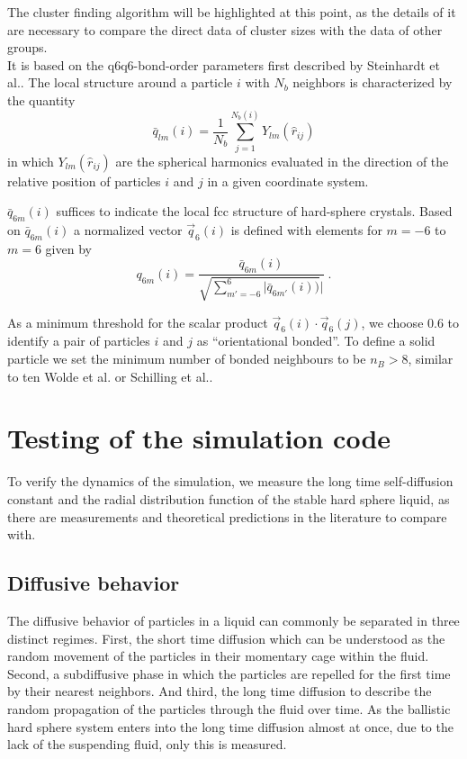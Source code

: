 The cluster finding algorithm will be highlighted at this point, as the details of it are necessary to compare the direct data of cluster sizes with the data of other groups.\\ 
It is based on the q6q6-bond-order parameters first described by Steinhardt et al.\cite{Steinhardt1983}.
The local structure around a particle $i$ with $N_b$ neighbors is characterized by the quantity
\begin{equation}
\label{eqn:local_q6}
\bar{q}_{lm}(i) = \frac{1}{N_b} \sum^{N_b (i)}_{j=1} Y_{lm} (\hat{r}_{ij})
\end{equation}
in which $Y_{lm}(\hat{r}_{ij})$ are the spherical harmonics evaluated in the direction of the relative position of particles $i$ and $j$ in a given coordinate system.

$\bar{q}_{6m}(i)$ suffices to indicate the local fcc structure of hard-sphere crystals. Based on $\bar{q}_{6m}(i)$  a normalized vector $\vec{q}_{6}(i)$ is defined with elements for $m=-6$ to $m=6$ given by
\begin{equation}
q_{6m}(i) = \frac{\bar{q}_{6m}(i)}{ \sqrt{\sum_{m'=-6}^{6} |{\bar{q}_{6m'}(i)})}|  } \; \text{.}
\end{equation}

As a minimum threshold for the scalar product $\vec{q}_6(i) \cdot \vec{q}_6(j)$, we choose 0.6 to identify a pair of particles $i$ and $j$ as ``orientational bonded''. To define a solid particle we set the minimum number of bonded neighbours to be $n_B > 8$, similar to ten Wolde et al.\cite{TenWolde1995} or Schilling et al.\cite{Schilling2011}.

\section{Testing of the simulation code}
\label{sec:probe}
To verify the dynamics of the simulation, we measure the long time self-diffusion constant and the radial distribution function of the stable hard sphere liquid, as there are measurements and theoretical predictions in the literature to compare with.

\subsection{Diffusive behavior}
\label{sec:diffusion_probe}
The diffusive behavior of particles in a liquid can commonly be separated in three distinct regimes. First, the short time diffusion which can be understood as the random movement of the particles in their momentary cage within the fluid. Second, a subdiffusive phase in which the particles are repelled for the first time by their nearest neighbors. And third, the long time diffusion to describe the random propagation of the particles through the fluid over time. As the ballistic hard sphere system enters into the long time diffusion almost at once, due to the lack of the suspending fluid, only this is measured.\\

